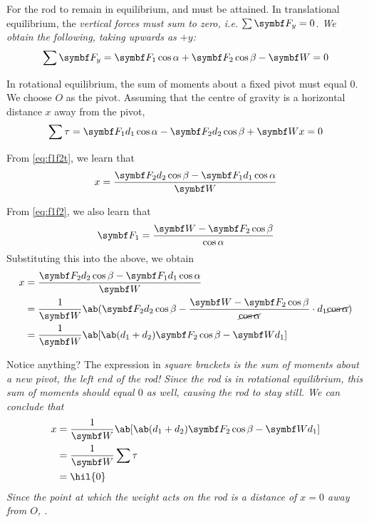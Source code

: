 For the rod to remain in equilibrium, 
and 
must be attained. In translational equilibrium, the \it{vertical}
forces must sum to
zero, i.e. \(\sum\mv{F}_y = 0\).
We obtain the following, taking upwards as \(+y\):
\begin{equation}
  \sum\mv{F}_y = \mv{F}_1\cos\alpha + \mv{F}_2\cos\beta - \mv{W} = 0
  \label{eq:f1f2}
\end{equation}

In rotational equilibrium, the sum of moments about a fixed pivot
must equal \(0\).
We choose \(O\) as the pivot.
Assuming that the centre of gravity is a horizontal distance \(x\)
away from the pivot,
\begin{equation}
  \sum\tau =\mv{F}_1d_1\cos\alpha - \mv{F}_2d_2\cos\beta  + \mv{W}x = 0
  \label{eq:f1f2t}
\end{equation}

From \cref{eq:f1f2t}, we learn that
\begin{equation*}
  x = \f{\mv{F}_2d_2\cos\beta - \mv{F}_1d_1\cos\alpha}{\mv{W}}
\end{equation*}

From \cref{eq:f1f2}, we also learn that
\begin{equation*}
  \mv{F}_1 = \f{\mv{W} - \mv{F}_2\cos\beta}{\cos\alpha}
\end{equation*}
Substituting this into the above, we obtain
\begin{align*}
  x &= \f{\mv{F}_2d_2\cos\beta - \mv{F}_1d_1\cos\alpha}{\mv{W}} \\
  &= \f{1}{\mv{W}} \ab(\mv{F}_2d_2\cos\beta -
    \f{\mv{W}-\mv{F}_2\cos\beta}{\cancel{\cos\alpha}}\cdot
  d_1\cancel{\cos\alpha}) \\
  &= \f{1}{\mv{W}} \ab[\ab(d_1+d_2)\mv{F}_2\cos\beta - \mv{W}d_1]
\end{align*}

Notice anything? The expression in \it{square brackets} is the sum of moments
about a new pivot, the left end of the rod! Since the rod is in
rotational equilibrium,
this sum of moments should equal \(0\) as well, causing the rod to stay still.
We can conclude that
\begin{align*}
  x
  &= \f{1}{\mv{W}} \ab[\ab(d_1+d_2)\mv{F}_2\cos\beta - \mv{W}d_1] \\
  &= \f{1}{\mv{W}} \sum\tau \\
  &= \hil{0}
\end{align*}
Since the point at which the weight acts on the rod is a distance of \(x = 0\)
away from \(O\), .

